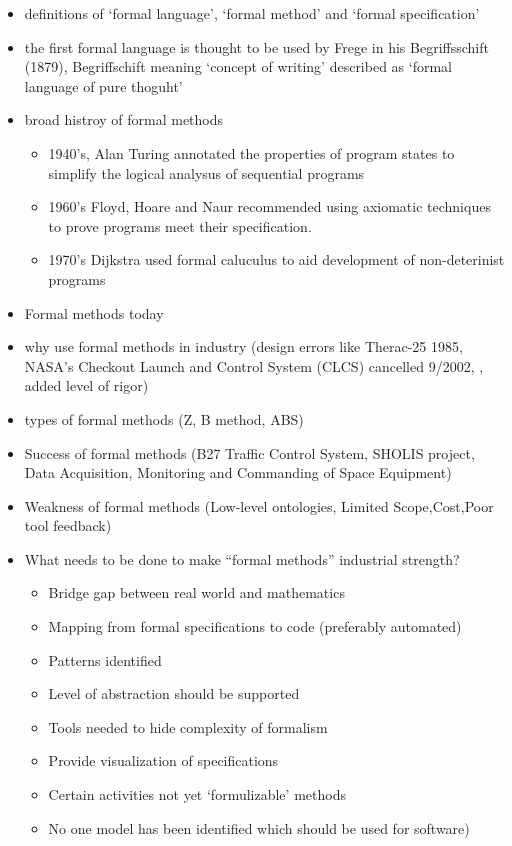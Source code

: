 \begin{itemize}
\item definitions of `formal language', `formal method' and `formal specification'

\item the first formal language is thought to be used by Frege in his Begriffsschift (1879), Begriffschift meaning `concept of writing' described as `formal language of pure thoguht'

\item broad histroy of formal methods 

\begin{itemize}
\item 1940's, Alan Turing annotated the properties of program states to simplify the logical analysus of sequential programs

\item 1960's Floyd, Hoare and Naur recommended using axiomatic techniques to prove programs meet their specification.

\item 1970's Dijkstra used formal caluculus to aid development of non-deterinist programs
\end{itemize}

\item Formal methods today

\item why use formal methods in industry (design errors like Therac-25 1985, NASA’s Checkout Launch and Control System (CLCS) cancelled 9/2002, , added level of rigor)

\item types of formal methods (Z, B method, ABS)

\item Success of formal methods (B27 Traffic Control System, SHOLIS project, Data Acquisition, Monitoring and Commanding of Space Equipment)

\item Weakness of formal methods (Low-level ontologies, Limited Scope,Cost,Poor tool feedback)

\item What needs to be done to make “formal methods” industrial strength? 
\begin{itemize}
\item Bridge gap between real world and mathematics
\item Mapping from formal specifications to code (preferably automated)
\item Patterns identified
\item Level of abstraction should be supported
\item Tools needed to hide complexity of formalism
\item Provide visualization of specifications 
\item Certain activities not yet ‘formulizable’ methods
\item No one model has been identified which should be used for software)
\end{itemize}
\end{itemize}

